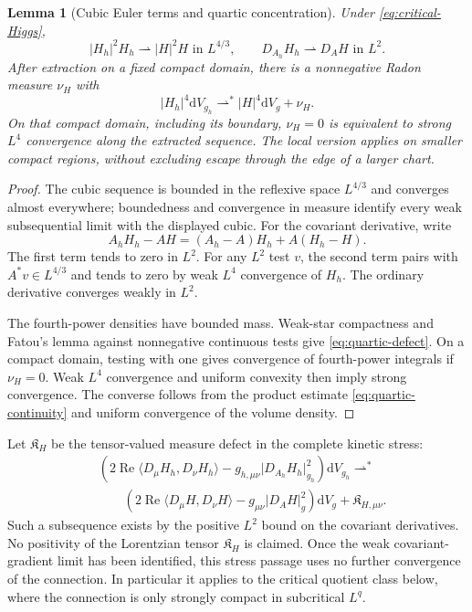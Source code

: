 \documentclass[11pt]{article}
\numberwithin{equation}{section}
\newtheorem{lemma}[lemma]{Lemma}
\theoremstyle{definition}
\theoremstyle{remark}
\newcommand{\dd}{\mathrm d}
\newcommand{\Rea}{\operatorname{Re}}
\newcommand{\abs}[1]{\lvert#1\rvert}
\newcommand{\ip}[2]{\langle#1,#2\rangle}
\newcommand{\dV}{\dd V}
\begin{document}
\begin{lemma}[Cubic Euler terms and quartic concentration]
\label{lem:critical-cubic}
Under \eqref{eq:critical-Higgs},
\begin{equation}
 \abs{H_h}^2H_h\rightharpoonup\abs H^2H\text{ in }L^{4/3},
 \qquad D_{A_h}H_h\rightharpoonup D_AH\text{ in }L^2.
 \label{eq:critical-weak}
\end{equation}
After extraction on a fixed compact domain, there is a nonnegative Radon measure $\nu_H$ with
\begin{equation}
 \abs{H_h}^4\dV_{g_h}\rightharpoonup^*
 \abs H^4\dV_g+\nu_H.
 \label{eq:quartic-defect}
\end{equation}
On that compact domain, including its boundary, $\nu_H=0$ is equivalent to strong $L^4$ convergence along the extracted sequence. The local version applies on smaller compact regions, without excluding escape through the edge of a larger chart.
\end{lemma}
\begin{proof}
The cubic sequence is bounded in the reflexive space $L^{4/3}$ and converges almost everywhere; boundedness and convergence in measure identify every weak subsequential limit with the displayed cubic. For the covariant derivative, write
\[
 A_hH_h-AH=(A_h-A)H_h+A(H_h-H).
\]
The first term tends to zero in $L^2$. For any $L^2$ test $v$, the second term pairs with $A^*v\in L^{4/3}$ and tends to zero by weak $L^4$ convergence of $H_h$. The ordinary derivative converges weakly in $L^2$.

The fourth-power densities have bounded mass. Weak-star compactness and Fatou's lemma against nonnegative continuous tests give \eqref{eq:quartic-defect}. On a compact domain, testing with one gives convergence of fourth-power integrals if $\nu_H=0$. Weak $L^4$ convergence and uniform convexity then imply strong convergence. The converse follows from the product estimate \eqref{eq:quartic-continuity} and uniform convergence of the volume density.
\end{proof}

Let $\mathfrak K_H$ be the tensor-valued measure defect in the complete kinetic stress:
\begin{align}
 &\left(2\Rea\ip{D_\mu H_h}{D_\nu H_h}
      -g_{h,\mu\nu}\abs{D_{A_h}H_h}_{g_h}^2\right)\dV_{g_h}
 \rightharpoonup^*\nonumber\\[-0.3em]
 &\hspace{2em}
 \left(2\Rea\ip{D_\mu H}{D_\nu H}
      -g_{\mu\nu}\abs{D_AH}_g^2\right)\dV_g+\mathfrak K_{H,\mu\nu}.
 \label{eq:kinetic-defect}
\end{align}
Such a subsequence exists by the positive $L^2$ bound on the covariant derivatives.
No positivity of the Lorentzian tensor $\mathfrak K_H$ is claimed.
Once the weak covariant-gradient limit has been identified, this stress
passage uses no further convergence of the connection. In particular it
applies to the critical quotient class below, where the connection is only
strongly compact in subcritical $L^q$.
\end{document}
